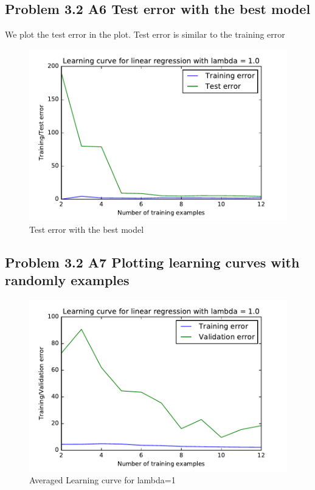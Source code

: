 \documentclass[pdftex,11pt]{article}
\begin{document}
\subsection{Problem 3.2 A6 Test error with the best model}
We plot the test error in the plot. Test error is similar to the training error
\begin{figure}[H]
  \caption{Test error with the best model}
  \centering
    \includegraphics[scale=1]{figtest.pdf}
\end{figure}

\subsection{Problem 3.2 A7 Plotting learning curves with randomly examples}

\begin{figure}[H]
  \caption{Averaged Learning curve for lambda=1}
  \centering
    \includegraphics[scale=1]{fig11.pdf}
\end{figure}
\end{document}
